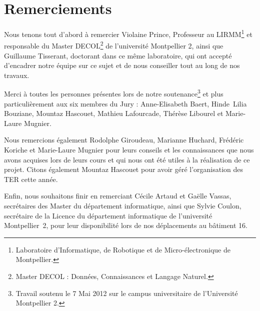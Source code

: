 \chapter*{Remerciements}

Nous tenons tout d'abord à remercier \mbox{Violaine} \mbox{Prince}, Professeur au LIRMM\footnote{Laboratoire d'Informatique, de Robotique et de Micro-électronique de Montpellier.} et responsable du Master DECOL\footnote{Master DECOL : Données, Connaissances et Langage Naturel.} de l'université Montpellier 2, ainsi que \mbox{Guillaume} \mbox{Tisserant}, doctorant dans ce même laboratoire, qui ont accepté d'encadrer notre équipe sur ce sujet et de nous conseiller tout au long de nos travaux.

Merci à toutes les personnes présentes lors de notre soutenance\footnote{Travail soutenu le 7 Mai 2012 sur le campus universitaire de l'Université Montpellier 2.} et plus particulièrement aux six membres du Jury : \mbox{Anne-Elisabeth} \mbox{Baert}, \mbox{Hinde Lilia} \mbox{Bouziane}, \mbox{Mountaz} \mbox{Hascouet}, \mbox{Mathieu} \mbox{Lafourcade}, \mbox{Thérèse} \mbox{Libourel} et \mbox{Marie-Laure} \mbox{Mugnier}.

Nous remercions également \mbox{Rodolphe} \mbox{Giroudeau}, \mbox{Marianne} \mbox{Huchard}, \mbox{Frédéric} \mbox{Koriche} et \mbox{Marie-Laure} \mbox{Mugnier} pour leurs conseils et les connaissances que nous avons acquises lors de leurs cours et qui nous ont été utiles à la réalisation de ce projet. Citons également \mbox{Mountaz} \mbox{Hascouet} pour avoir géré l'organisation des TER cette année.

Enfin, nous souhaitons finir en remerciant \mbox{Cécile} \mbox{Artaud} et \mbox{Gaëlle} \mbox{Vassas}, secrétaires des Master du département informatique, ainsi que \mbox{Sylvie} \mbox{Coulon}, secrétaire de la Licence du département informatique de l'université \mbox{Montpellier~2}, pour leur disponibilité lors de nos déplacements au bâtiment 16.

